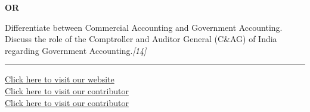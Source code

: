\documentclass[11pt,a4paper]{article}
\newcommand{\pts}[1]{\hfill   \textit{[#1]}}
\begin{document}
\centerline{   \textbf{OR}}

Differentiate between Commercial Accounting and Government Accounting. Discuss the role of the Comptroller and Auditor General (C\&AG) of India regarding Government Accounting.\pts{14}

\vfill
\rule{\linewidth}{0.4pt}

\begin{center}\small
\href{https://bhu-exam.vercel.app/}{Click here to visit our website}\\[4pt]
\href{https://me-aryan.vercel.app/}{Click here to visit our contributor}\\[4pt]
\href{https://quashan-me.vercel.app/}{Click here to visit our contributor}
\end{center}
\end{document}
